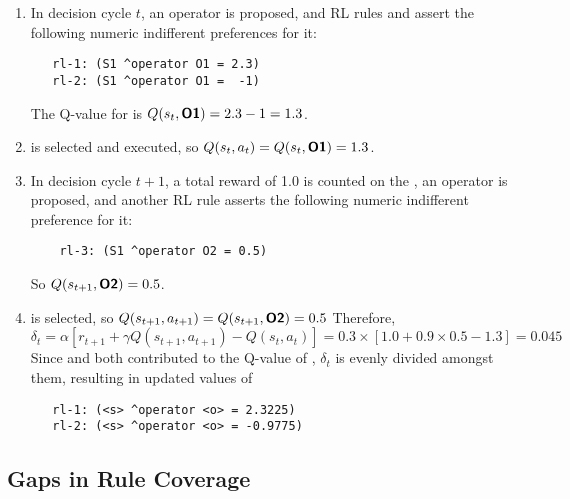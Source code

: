 \begin{enumerate}

\item In decision cycle $t$, an operator  is proposed, and RL rules  and  assert the following numeric indifferent preferences for it:
\begin{verbatim}
   rl-1: (S1 ^operator O1 = 2.3)
   rl-2: (S1 ^operator O1 =  -1)
\end{verbatim}  
	The Q-value for  is $Q(s_t, \soarb{O1}) = 2.3 - 1 = 1.3$.
	 
\item {} is selected and executed, so $Q(s_t, a_t) = Q(s_t, \soarb{O1}) = 1.3$.

\item In decision cycle $t+1$, a total reward of 1.0 is counted on the , an operator  is proposed, and another RL rule  asserts the following numeric indifferent preference for it:
\begin{verbatim}
	rl-3: (S1 ^operator O2 = 0.5)
\end{verbatim}
	So $Q(s_{t+1}, \soarb{O2}) = 0.5$.

\item {} is selected, so $Q(s_{t+1}, a_{t+1}) = Q(s_{t+1}, \soarb{O2}) = 0.5$
	Therefore, 
	$$\delta_t = \alpha \left[r_{t+1} + \gamma Q(s_{t+1}, a_{t+1}) - Q(s_t, a_t) \right] = 0.3 \times [ 1.0 + 0.9 \times 0.5 - 1.3 ] = 0.045$$
	Since  and  both contributed to the Q-value of , $\delta_t$ is evenly divided amongst them, resulting in updated values of
\begin{verbatim}
   rl-1: (<s> ^operator <o> = 2.3225)
   rl-2: (<s> ^operator <o> = -0.9775)
\end{verbatim}

\end{enumerate}

\subsection{Gaps in Rule Coverage}
\label{RL-gaps}

